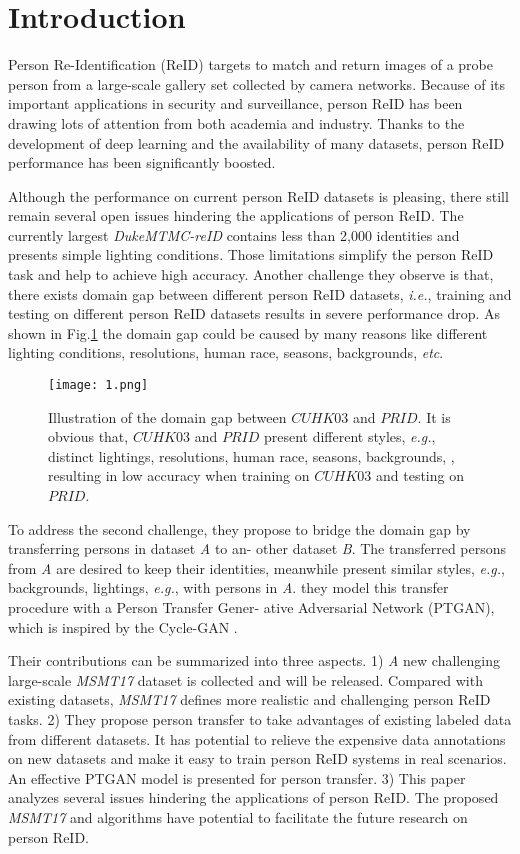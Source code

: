 \documentclass[10pt,twocolumn,letterpaper]{article}
\begin{document}
\section{Introduction}
	Person Re-Identification (ReID) targets to match and return images of a probe person from a large-scale gallery
	set collected by camera networks. Because of its important
	applications in security and surveillance, person ReID has
	been drawing lots of attention from both academia and industry. Thanks to the development of deep learning and the
	availability of many datasets, person ReID performance has
	been significantly boosted. 
	\par
	Although the performance on current person ReID
	datasets is pleasing, there still remain several open issues hindering the applications of person ReID. The currently largest \textit{DukeMTMC-reID}
	 \cite{zheng2017unlabeled} contains less than 2,000 identities and presents simple lighting conditions. Those limitations simplify the person ReID task and help to achieve high accuracy. Another challenge they observe is that, there exists domain gap between different person ReID datasets, \textit{i.e.}, training and testing on different person ReID datasets results in severe performance drop. As shown in Fig.\ref{fig1} the
	 domain gap could be caused by many reasons like different
	 lighting conditions, resolutions, human race, seasons, backgrounds, \textit{etc}.
	 \begin{figure}
	 	\centering
	 	\texttt{[image: 1.png]}
	 	\caption{Illustration of the domain gap between $CUHK03$
	 		and $PRID$. It is obvious that, $CUHK03$ and $PRID$ present
	 		different styles, \textit{e.g.}, distinct lightings, resolutions, human race, seasons, backgrounds, , resulting in low accuracy
	 		when training on $CUHK03$ and testing on $PRID$.}
 		\label{fig1}
	 \end{figure}
 \par
 To address the second challenge, they propose to bridge
 the domain gap by transferring persons in dataset \textit{A} to an-
 other dataset \textit{B}. The transferred persons from \textit{A} are desired
 to keep their identities, meanwhile present similar styles,
 \textit{e.g.}, backgrounds, lightings, \textit{e.g.}, with persons in \textit{A}. they
 model this transfer procedure with a Person Transfer Gener-
 ative Adversarial Network (PTGAN), which is inspired by
 the Cycle-GAN \cite{zhu2017unpaired}.
 \par
 Their contributions can be summarized into three aspects. 1) \textit{A} new challenging large-scale \textit{MSMT17} dataset
 is collected and will be released. Compared with existing
 datasets, \textit{MSMT17} defines more realistic and challenging
 person ReID tasks. 2) They propose person transfer to take
 advantages of existing labeled data from different datasets.
 It has potential to relieve the expensive data annotations on
 new datasets and make it easy to train person ReID systems
 in real scenarios. An effective PTGAN model is presented
 for person transfer. 3) This paper analyzes several issues
 hindering the applications of person ReID. The proposed
 \textit{MSMT17} and algorithms have potential to facilitate the future research on person ReID.
\end{document}
